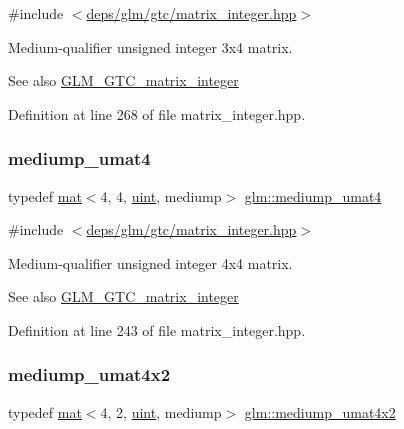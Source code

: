 {\ttfamily \#include $<$\hyperlink{matrix__integer_8hpp}{deps/glm/gtc/matrix\+\_\+integer.\+hpp}$>$}

Medium-\/qualifier unsigned integer 3x4 matrix. \begin{DoxySeeAlso}{See also}
\hyperlink{group__gtc__matrix__integer}{G\+L\+M\+\_\+\+G\+T\+C\+\_\+matrix\+\_\+integer} 
\end{DoxySeeAlso}


Definition at line 268 of file matrix\+\_\+integer.\+hpp.

\mbox{\label{group__gtc__matrix__integer_ga0653e9571754f1e33203290aaf3dfc5d}} 
\subsubsection{\texorpdfstring{mediump\+\_\+umat4}{mediump\_umat4}}
{\footnotesize\ttfamily typedef \hyperlink{structglm_1_1mat}{mat}$<$4, 4, \hyperlink{group__core__precision_ga4fd29415871152bfb5abd588334147c8}{uint}, mediump$>$ \hyperlink{group__gtc__matrix__integer_ga0653e9571754f1e33203290aaf3dfc5d}{glm\+::mediump\+\_\+umat4}}



{\ttfamily \#include $<$\hyperlink{matrix__integer_8hpp}{deps/glm/gtc/matrix\+\_\+integer.\+hpp}$>$}

Medium-\/qualifier unsigned integer 4x4 matrix. \begin{DoxySeeAlso}{See also}
\hyperlink{group__gtc__matrix__integer}{G\+L\+M\+\_\+\+G\+T\+C\+\_\+matrix\+\_\+integer} 
\end{DoxySeeAlso}


Definition at line 243 of file matrix\+\_\+integer.\+hpp.

\mbox{\label{group__gtc__matrix__integer_gaf44e145efd637df6f2a300f968ebb51f}} 
\subsubsection{\texorpdfstring{mediump\+\_\+umat4x2}{mediump\_umat4x2}}
{\footnotesize\ttfamily typedef \hyperlink{structglm_1_1mat}{mat}$<$4, 2, \hyperlink{group__core__precision_ga4fd29415871152bfb5abd588334147c8}{uint}, mediump$>$ \hyperlink{group__gtc__matrix__integer_gaf44e145efd637df6f2a300f968ebb51f}{glm\+::mediump\+\_\+umat4x2}}



